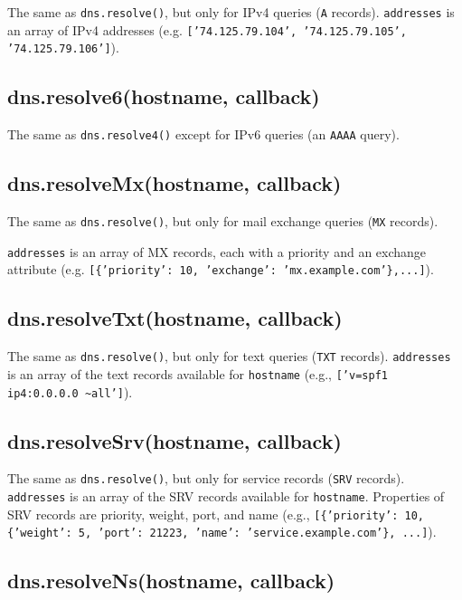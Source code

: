 The same as \texttt{dns.resolve()}, but only for IPv4 queries
(\texttt{A} records). \texttt{addresses} is an array of IPv4 addresses
(e.g. \texttt{{[}'74.125.79.104', '74.125.79.105', '74.125.79.106'{]}}).

\subsection{dns.resolve6(hostname, callback)}

The same as \texttt{dns.resolve4()} except for IPv6 queries (an
\texttt{AAAA} query).

\subsection{dns.resolveMx(hostname, callback)}

The same as \texttt{dns.resolve()}, but only for mail exchange queries
(\texttt{MX} records).

\texttt{addresses} is an array of MX records, each with a priority and
an exchange attribute (e.g.
\texttt{{[}\{'priority': 10, 'exchange': 'mx.example.com'\},...{]}}).

\subsection{dns.resolveTxt(hostname, callback)}

The same as \texttt{dns.resolve()}, but only for text queries
(\texttt{TXT} records). \texttt{addresses} is an array of the text
records available for \texttt{hostname} (e.g.,
\texttt{{[}'v=spf1 ip4:0.0.0.0 \textasciitilde{}all'{]}}).

\subsection{dns.resolveSrv(hostname, callback)}

The same as \texttt{dns.resolve()}, but only for service records
(\texttt{SRV} records). \texttt{addresses} is an array of the SRV
records available for \texttt{hostname}. Properties of SRV records are
priority, weight, port, and name (e.g.,
\texttt{{[}\{'priority': 10, \{'weight': 5, 'port': 21223, 'name': 'service.example.com'\}, ...{]}}).

\subsection{dns.resolveNs(hostname, callback)}

